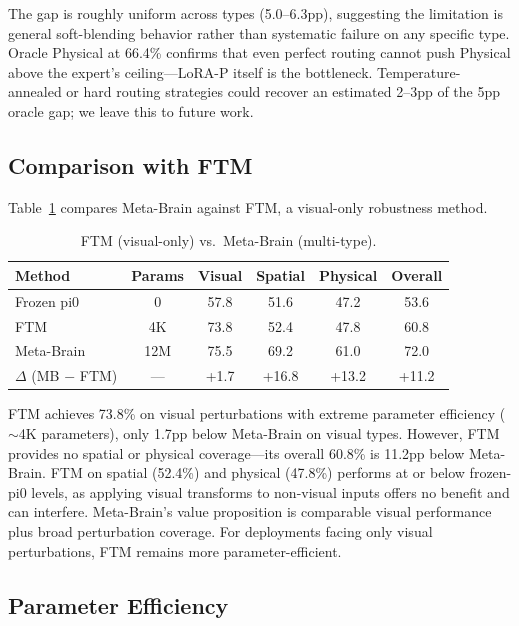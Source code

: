 \documentclass[10pt,twocolumn]{article}
\begin{document}
The gap is roughly uniform across types (5.0--6.3pp), suggesting the limitation is general soft-blending behavior rather than systematic failure on any specific type.
Oracle Physical at 66.4\% confirms that even perfect routing cannot push Physical above the expert's ceiling---LoRA-P itself is the bottleneck.
Temperature-annealed or hard routing strategies could recover an estimated 2--3pp of the 5pp oracle gap; we leave this to future work.

\subsection{Comparison with FTM}
\label{sec:ftm}

Table~\ref{tab:ftm} compares Meta-Brain against FTM, a visual-only robustness method.

\begin{table}[h]
\centering
\caption{FTM (visual-only) vs.\ Meta-Brain (multi-type).}
\label{tab:ftm}
\small
\begin{tabular}{lccccc}
\toprule
Method & Params & Visual & Spatial & Physical & Overall \\
\midrule
Frozen pi0 & 0 & 57.8 & 51.6 & 47.2 & 53.6 \\
FTM & 4K & 73.8 & 52.4 & 47.8 & 60.8 \\
Meta-Brain & 12M & 75.5 & 69.2 & 61.0 & 72.0 \\
$\Delta$ (MB $-$ FTM) & --- & +1.7 & +16.8 & +13.2 & +11.2 \\
\bottomrule
\end{tabular}
\end{table}

FTM achieves 73.8\% on visual perturbations with extreme parameter efficiency (${\sim}$4K parameters), only 1.7pp below Meta-Brain on visual types.
However, FTM provides no spatial or physical coverage---its overall 60.8\% is 11.2pp below Meta-Brain.
FTM on spatial (52.4\%) and physical (47.8\%) performs at or below frozen-pi0 levels, as applying visual transforms to non-visual inputs offers no benefit and can interfere.
Meta-Brain's value proposition is comparable visual performance plus broad perturbation coverage.
For deployments facing only visual perturbations, FTM remains more parameter-efficient.

\subsection{Parameter Efficiency}
\label{sec:param_efficiency}
\end{document}
